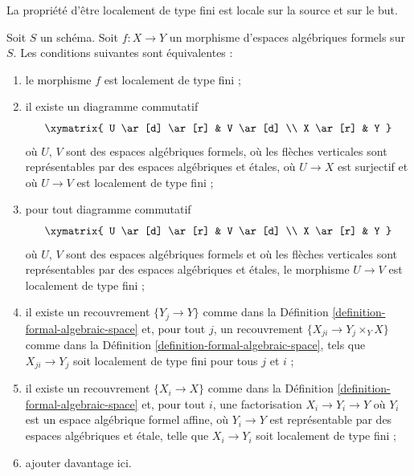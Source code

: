 \noindent
La propriété d'être localement de type fini est locale sur la source et sur le but.

\begin{lemma}
\label{lemma-finite-type-local}
Soit $S$ un schéma. Soit $f : X \to Y$ un morphisme d'espaces algébriques formels
sur $S$. Les conditions suivantes sont équivalentes :
\begin{enumerate}
\item le morphisme $f$ est localement de type fini ;
\item il existe un diagramme commutatif
$$
\xymatrix{
U \ar[d] \ar[r] & V \ar[d] \\
X \ar[r] & Y
}
$$
où $U$, $V$ sont des espaces algébriques formels, où les flèches verticales sont
représentables par des espaces algébriques et étales, où $U \to X$
est surjectif et où $U \to V$ est localement de type fini ;
\item pour tout diagramme commutatif
$$
\xymatrix{
U \ar[d] \ar[r] & V \ar[d] \\
X \ar[r] & Y
}
$$
où $U$, $V$ sont des espaces algébriques formels et où les flèches verticales
sont représentables par des espaces algébriques et étales, le morphisme
$U \to V$ est localement de type fini ;
\item il existe un recouvrement $\{Y_j \to Y\}$ comme dans la
Définition \ref{definition-formal-algebraic-space}
et, pour tout $j$, un recouvrement $\{X_{ji} \to Y_j \times_Y X\}$ comme dans la
Définition \ref{definition-formal-algebraic-space}, tels que
$X_{ji} \to Y_j$ soit localement de type fini pour tous $j$ et $i$ ;
\item il existe un recouvrement $\{X_i \to X\}$ comme dans la
Définition \ref{definition-formal-algebraic-space}
et, pour tout $i$, une factorisation $X_i \to Y_i \to Y$ où $Y_i$
est un espace algébrique formel affine, où $Y_i \to Y$ est représentable
par des espaces algébriques et étale, telle que $X_i \to Y_i$ soit
localement de type fini ;
\item ajouter davantage ici.
\end{enumerate}
\end{lemma}


